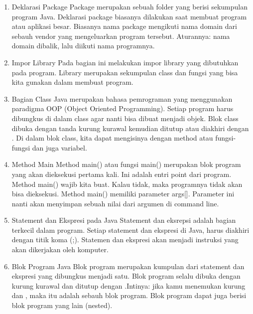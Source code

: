 \begin{enumerate}
\item Deklarasi Package
Package merupakan sebuah folder yang berisi sekumpulan program Java. Deklarasi package biasanya dilakukan saat membuat program atau aplikasi besar. Biasanya nama package mengikuti nama domain dari sebauh vendor yang mengeluarkan program tersebut. Aturannya: nama domain dibalik, lalu diikuti nama programnya.

\item Impor Library
Pada bagian ini melakukan impor library yang dibutuhkan pada program. Library merupakan sekumpulan class dan fungsi yang bisa kita gunakan dalam membuat program.

\item Bagian Class
Java merupakan bahasa pemrograman yang menggunakan paradigma OOP (Object Oriented Programming). Setiap program harus dibungkus di dalam class agar nanti bisa dibuat menjadi objek. Blok class dibuka dengan tanda kurung kurawal { kemudian ditutup atau diakhiri dengan }. Di dalam blok class, kita dapat mengisinya dengan method atau fungsi-fungsi dan juga variabel.

\item Method Main
Method main() atau fungsi main() merupakan blok program yang akan dieksekusi pertama kali. Ini adalah entri point dari program. Method main() wajib kita buat. Kalau tidak, maka programnya tidak akan bisa dieksekusi. Method main() memiliki parameter args[]. Parameter ini nanti akan menyimpan sebuah nilai dari argumen di command line.

\item Statement dan Ekspresi pada Java
Statement dan eksrepsi adalah bagian terkecil dalam program. Setiap statement dan ekspresi di Java, harus diakhiri dengan titik koma (;). Statemen dan ekspresi akan menjadi instruksi yang akan dikerjakan oleh komputer.

\item Blok Program Java
Blok program merupakan kumpulan dari statement dan ekspresi yang dibungkus menjadi satu. Blok program selalu dibuka dengan kurung kurawal { dan ditutup dengan }.Intinya: jika kamu menemukan kurung { dan }, maka itu adalah sebauh blok program. Blok program dapat juga berisi blok program yang lain (nested).


\end{enumerate}
